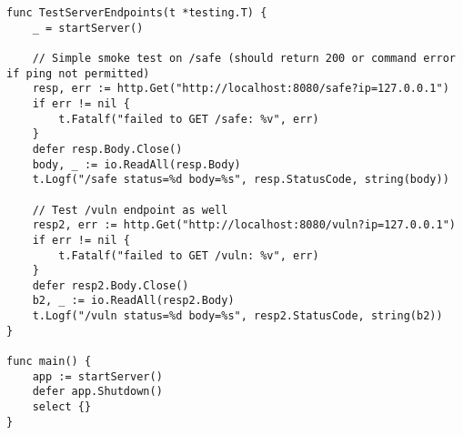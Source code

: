 \documentclass{article}
\begin{document}
\begin{lstlisting}[caption={Go 언어와 Fiber 프레임워크를 사용한 서버 구현 예시}, label={lst:go-server}, showspaces=false,showstringspaces=false]
func TestServerEndpoints(t *testing.T) {
	_ = startServer()

	// Simple smoke test on /safe (should return 200 or command error if ping not permitted)
	resp, err := http.Get("http://localhost:8080/safe?ip=127.0.0.1")
	if err != nil {
		t.Fatalf("failed to GET /safe: %v", err)
	}
	defer resp.Body.Close()
	body, _ := io.ReadAll(resp.Body)
	t.Logf("/safe status=%d body=%s", resp.StatusCode, string(body))

	// Test /vuln endpoint as well
	resp2, err := http.Get("http://localhost:8080/vuln?ip=127.0.0.1")
	if err != nil {
		t.Fatalf("failed to GET /vuln: %v", err)
	}
	defer resp2.Body.Close()
	b2, _ := io.ReadAll(resp2.Body)
	t.Logf("/vuln status=%d body=%s", resp2.StatusCode, string(b2))
}

func main() {
	app := startServer()
	defer app.Shutdown()
	select {}
}

\end{lstlisting}
\end{document}
